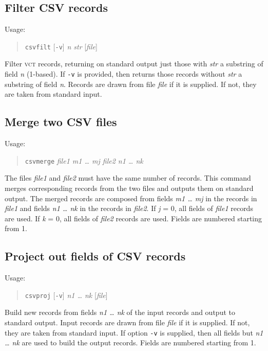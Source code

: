 \documentclass[12pt,fleqn]{article}
\newcommand{\csv}{\textsc{vct}}
\begin{document}
\subsection{Filter CSV records}
Usage:
\begin{quote}
   \texttt{csvfilt} [\texttt{-v}] \textit{n str} [\textit{file}]
\end{quote}
Filter \csv{} records, returning on standard output just those with
\textit{str} a substring of field \textit{n} (1-based).
%
If \texttt{-v} is provided, then returns those records without
\textit{str} a substring of field \textit{n}.
Records are drawn from file \textit{file} if it is supplied. If not, they
are taken from standard input.

\subsection{Merge two CSV files}
Usage:
\begin{quote}
   \texttt{csvmerge} \textit{file1 m1 \ldots{} mj file2 n1 \ldots{} nk}
\end{quote}
The files \textit{file1} and \textit{file2} must have the same number
of records.
This command merges corresponding records from the two files and outputs
them on standard output.
The merged records are composed from 
fields \textit{m1 \ldots{} mj} in the records in \textit{file1} and 
fields \textit{n1 \ldots{} nk} in the records in \textit{file2}.
If \textit{j} = 0, all fields of  \textit{file1} records are used.
If \textit{k} = 0, all fields of  \textit{file2} records are used.
Fields are numbered starting from 1.

\subsection{Project out fields of CSV records}
Usage:
\begin{quote}
  \texttt{csvproj} [\texttt{-v}] \textit{n1 \ldots{} nk} [\textit{file}]
\end{quote}
Build new records from fields \textit{n1 \ldots{} nk} of the input
records and output to standard output.  Input records are drawn from
file \textit{file} if it is supplied. If not, they are taken from
standard input.  If option \texttt{-v} is supplied, then all fields
but \textit{n1 \ldots{} nk} are used to build the output records.
Fields are numbered starting from 1.
\end{document}
